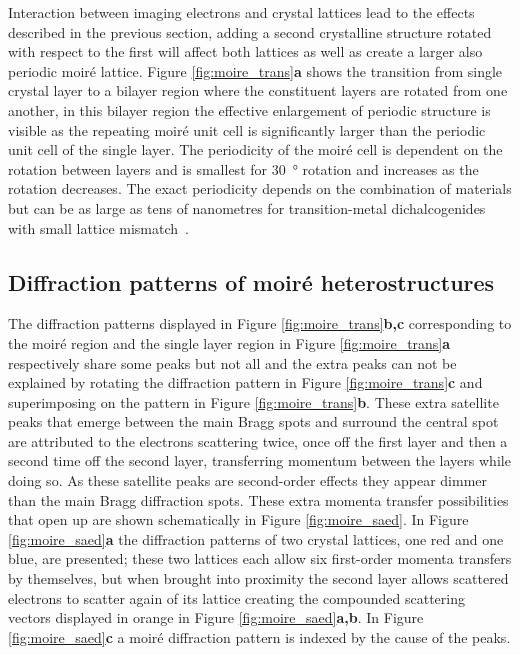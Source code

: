 Interaction between imaging electrons and crystal lattices lead to the effects described in the previous section, adding a second crystalline structure rotated with respect to the first will affect both lattices as well as create a larger also periodic moiré lattice.
Figure \ref{fig:moire_trans}\textbf{a} shows the transition from single crystal layer to a bilayer region where the constituent layers are rotated from one another, in this bilayer region the effective enlargement of periodic structure is visible as the repeating moiré unit cell is significantly larger than the periodic unit cell of the single layer. The periodicity of the moiré cell is dependent on the rotation between layers and is smallest for \SI{30}{\degree} rotation and increases as the rotation decreases. The exact periodicity depends on the combination of materials but can be as large as tens of nanometres for transition-metal dichalcogenides with small lattice mismatch~\cite{rosenbergerAtomicReconstructionMoire}.

\subsection{Diffraction patterns of moiré heterostructures}
The diffraction patterns displayed in Figure \ref{fig:moire_trans}\textbf{b,c} corresponding to the moiré region and the single layer region in Figure \ref{fig:moire_trans}\textbf{a} respectively share some peaks but not all and the extra peaks can not be explained by rotating the diffraction pattern in Figure \ref{fig:moire_trans}\textbf{c} and superimposing on the pattern in Figure \ref{fig:moire_trans}\textbf{b}.
These extra satellite peaks that emerge between the main Bragg spots and surround the central spot are attributed to the electrons scattering twice, once off the first layer and then a second time off the second layer, transferring momentum between the layers while doing so. As these satellite peaks are second-order effects they appear dimmer than the main Bragg diffraction spots.
These extra momenta transfer possibilities that open up are shown schematically in Figure \ref{fig:moire_saed}. In Figure \ref{fig:moire_saed}\textbf{a} the diffraction patterns of two crystal lattices, one red and one blue, are presented; these two lattices each allow six first-order momenta transfers by themselves, but when brought into proximity the second layer allows scattered electrons to scatter again of its lattice creating the compounded scattering vectors displayed in orange in Figure \ref{fig:moire_saed}\textbf{a,b}. In Figure \ref{fig:moire_saed}\textbf{c} a moiré diffraction pattern is indexed by the cause of the peaks.


